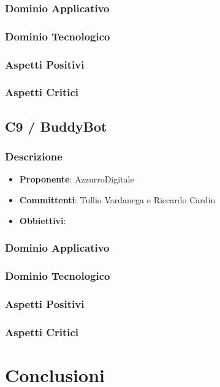 \documentclass[a4paper, 12pt]{article}
\begin{document}
\subsubsection{Dominio Applicativo}
\subsubsection{Dominio Tecnologico}
\subsubsection{Aspetti Positivi}
\subsubsection{Aspetti Critici}
\subsection{C9 / BuddyBot}
\subsubsection{Descrizione}
\begin{itemize}
    \item \textbf{Proponente}: AzzurroDigitale
    \item \textbf{Committenti}: Tullio Vardanega e Riccardo Cardin
    \item \textbf{Obbiettivi}: 
\end{itemize}
\subsubsection{Dominio Applicativo}
\subsubsection{Dominio Tecnologico}
\subsubsection{Aspetti Positivi}
\subsubsection{Aspetti Critici}

\section{Conclusioni}
\end{document}
